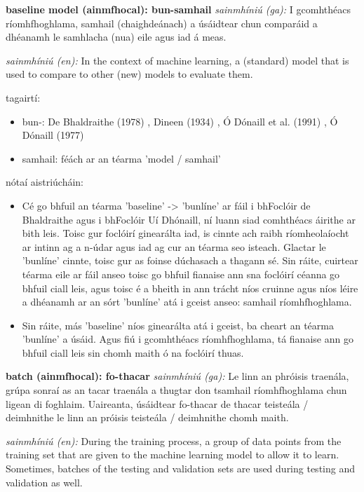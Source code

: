 \documentclass{article}
\begin{document}
\textbf{baseline model (ainmfhocal): bun-samhail}
\textit{sainmhíniú (ga):} I gcomhthéacs ríomhfhoghlama, samhail (chaighdeánach) a úsáidtear chun comparáid a dhéanamh le samhlacha (nua) eile agus iad á meas.

\textit{sainmhíniú (en):} In the context of machine learning, a (standard) model that is used to compare to other (new) models to evaluate them.

tagairtí:
\begin{itemize}
	\item bun-: De Bhaldraithe (1978) \cite{de-bhaldraithe}, Dineen (1934) \cite{dineen}, Ó Dónaill et al. (1991) \cite{focloir-beag}, Ó Dónaill (1977) \cite{odonaill}
	\item samhail: féách ar an téarma 'model / samhail'
\end{itemize}

nótaí aistriúcháin:
\begin{itemize}
	\item Cé go bhfuil an téarma 'baseline' -> 'bunlíne' ar fáil i bhFoclóir de Bhaldraithe agus i bhFoclóir Uí Dhónaill, ní luann siad comhthéacs áirithe ar bith leis. Toisc gur foclóirí ginearálta iad, is cinnte ach raibh ríomheolaíocht ar intinn ag a n-údar agus iad ag cur an téarma seo isteach. Glactar le 'bunlíne' cinnte, toisc gur as foinse dúchasach a thagann sé. Sin ráite, cuirtear téarma eile ar fáil anseo toisc go bhfuil fianaise ann sna foclóirí céanna go bhfuil ciall leis, agus toisc é a bheith in ann trácht níos cruinne agus níos léire a dhéanamh ar an sórt 'bunlíne' atá i gceist anseo: samhail ríomhfhoghlama.
	\item Sin ráite, más 'baseline' níos ginearálta atá i gceist, ba cheart an téarma 'bunlíne' a úsáid. Agus fiú i gcomhthéacs ríomhfhoghlama, tá fianaise ann go bhfuil ciall leis sin chomh maith ó na foclóirí thuas.
\end{itemize}


\textbf{batch (ainmfhocal): fo-thacar}
\textit{sainmhíniú (ga):} Le linn an phróisis traenála, grúpa sonraí as an tacar traenála a thugtar don tsamhail ríomhfhoghlama chun ligean di foghlaim. Uaireanta, úsáidtear fo-thacar de thacar teisteála / deimhnithe le linn an próisis teisteála / deimhnithe chomh maith.

\textit{sainmhíniú (en):} During the training process, a group of data points from the training set that are given to the machine learning model to allow it to learn. Sometimes, batches of the testing and validation sets are used during testing and validation as well.
\end{document}
